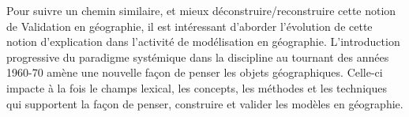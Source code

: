 Pour suivre un chemin similaire, et mieux déconstruire/reconstruire cette notion de Validation en géographie, il est intéressant d'aborder l'évolution de cette notion d'explication dans l'activité de modélisation en géographie. L'introduction progressive du paradigme systémique dans la discipline au tournant des années 1960-70 amène une nouvelle façon de penser les objets géographiques. Celle-ci impacte à la fois le champs lexical, les concepts, les méthodes et les techniques qui supportent la façon de penser, construire et valider les modèles en géographie.